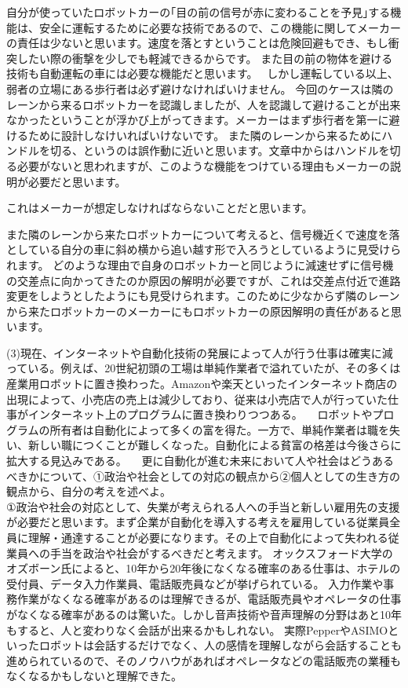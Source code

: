 \documentclass[11pt,a4paper]{jsarticle}
\begin{document}
自分が使っていたロボットカーの｢目の前の信号が赤に変わることを予見｣する機能は、安全に運転するために必要な技術であるので、この機能に関してメーカーの責任は少ないと思います。速度を落とすということは危険回避もでき、もし衝突したい際の衝撃を少しでも軽減できるからです。
また目の前の物体を避ける技術も自動運転の車には必要な機能だと思います。　%
しかし運転している以上、弱者の立場にある歩行者は必ず避けなければいけません。
今回のケースは隣のレーンから来るロボットカーを認識しましたが、人を認識して避けることが出来なかったということが浮かび上がってきます。メーカーはまず歩行者を第一に避けるために設計しなけいればいけないです。
また隣のレーンから来るためにハンドルを切る、というのは誤作動に近いと思います。文章中からはハンドルを切る必要がないと思われますが、このような機能をつけている理由もメーカーの説明が必要だと思います。

これはメーカーが想定しなければならないことだと思います。

また隣のレーンから来たロボットカーについて考えると、信号機近くで速度を落としている自分の車に斜め横から追い越す形で入ろうとしているように見受けられます。
どのような理由で自身のロボットカーと同じように減速せずに信号機の交差点に向かってきたのか原因の解明が必要ですが、これは交差点付近で進路変更をしようとしたようにも見受けられます。このために少なからず隣のレーンから来たロボットカーのメーカーにもロボットカーの原因解明の責任があると思います。

\newpage
 (3)現在、インターネットや自動化技術の発展によって人が行う仕事は確実に減っている。例えば、20世紀初頭の工場は単純作業者で溢れていたが、その多くは産業用ロボットに置き換わった。Amazonや楽天といったインターネット商店の出現によって、小売店の売上は減少しており、従来は小売店で人が行っていた仕事がインターネット上のプログラムに置き換わりつつある。
　ロボットやプログラムの所有者は自動化によって多くの富を得た。一方で、単純作業者は職を失い、新しい職につくことが難しくなった。自動化による貧富の格差は今後さらに拡大する見込みである。
　更に自動化が進む未来において人や社会はどうあるべきかについて、①政治や社会としての対応の観点から②個人としての生き方の観点から、自分の考えを述べよ。\\
 
①政治や社会の対応として、失業が考えられる人への手当と新しい雇用先の支援が必要だと思います。まず企業が自動化を導入する考えを雇用している従業員全員に理解・通達することが必要になります。その上で自動化によって失われる従業員への手当を政治や社会がするべきだと考えます。
オックスフォード大学のオズボーン氏によると、10年から20年後になくなる確率のある仕事は、ホテルの受付員、データ入力作業員、電話販売員などが挙げられている。
入力作業や事務作業がなくなる確率があるのは理解できるが、電話販売員やオペレータの仕事がなくなる確率があるのは驚いた。しかし音声技術や音声理解の分野はあと10年もすると、人と変わりなく会話が出来るかもしれない。
実際PepperやASIMOといったロボットは会話するだけでなく、人の感情を理解しながら会話することも進められているので、そのノウハウがあればオペレータなどの電話販売の業種もなくなるかもしないと理解できた。
\end{document}
